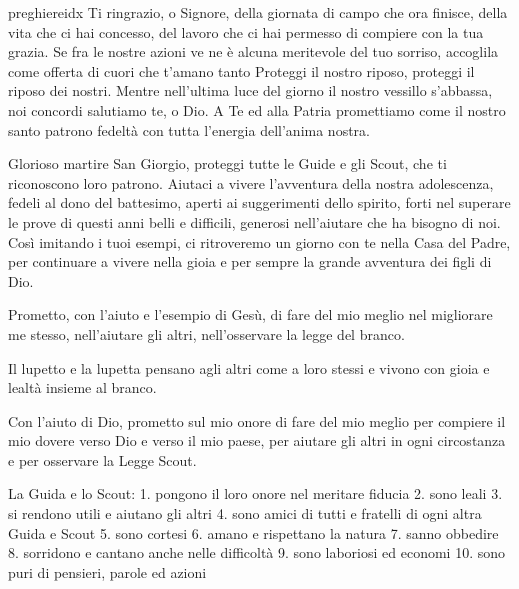 \documentclass[a4paper,12pt, twoside]{article}
\begin{document}
\begin{songs}{preghiereidx}
\beginverse
Ti ringrazio, o Signore,
della giornata di campo che ora finisce,
della vita che ci hai concesso,
del lavoro che ci hai permesso di compiere con la tua grazia.
Se fra le nostre azioni ve ne è alcuna meritevole del tuo sorriso,
accoglila come offerta di cuori che t’amano tanto
Proteggi il nostro riposo, proteggi il riposo dei nostri.
Mentre nell’ultima luce del giorno il nostro vessillo s’abbassa,
noi concordi salutiamo te, o Dio.
A Te ed alla Patria promettiamo come il nostro santo patrono
fedeltà con tutta l’energia dell’anima nostra.

\endverse
\endsong

\begin{intersong}
\bigskip
\end{intersong}


\beginverse
Glorioso martire San Giorgio,
proteggi tutte le Guide e gli Scout,
che ti riconoscono loro patrono.
Aiutaci a vivere l’avventura della nostra adolescenza,
fedeli al dono del battesimo,
aperti ai suggerimenti dello spirito,
forti nel superare le prove di questi anni belli e difficili,
generosi nell’aiutare che ha bisogno di noi.
Così imitando i tuoi esempi,
ci ritroveremo un giorno con te nella Casa del Padre,
per continuare a vivere nella gioia e per sempre
la grande avventura dei figli di Dio.
\endverse
\endsong

\nextcol

\beginverse
Prometto, con l’aiuto e l’esempio di Gesù, di fare del mio meglio
nel migliorare me stesso,
nell’aiutare gli altri,
nell’osservare la legge del branco.
\endverse
\endsong



\beginverse
Il lupetto e la lupetta pensano agli altri come a loro stessi
e vivono con gioia e lealtà insieme al branco.
\endverse
\endsong

\begin{intersong}
\bigskip
\end{intersong}


\beginverse
Con l’aiuto di Dio, prometto sul mio onore di fare del
mio meglio per compiere il mio dovere verso Dio e verso
il mio paese, per aiutare gli altri in ogni circostanza e per
osservare la Legge Scout.
\endverse
\endsong

\bigskip

\beginverse
La Guida e lo Scout:
1. pongono il loro onore nel meritare fiducia
2. sono leali
3. si rendono utili e aiutano gli altri
4. sono amici di tutti e fratelli di ogni altra Guida e Scout
5. sono cortesi
6. amano e rispettano la natura
7. sanno obbedire
8. sorridono e cantano anche nelle difficoltà
9. sono laboriosi ed economi
10. sono puri di pensieri, parole ed azioni
\endverse
\endsong

\end{songs}
\end{document}
